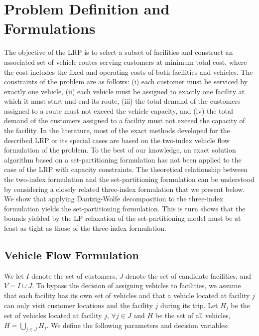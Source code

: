 \documentclass[graybox]{./styles/svmult}
\begin{document}
\section{Problem Definition and Formulations}
\label{sec:ProbDef}
The objective of the LRP is to select a subset of facilities and
construct an associated set of vehicle routes serving customers at
minimum total cost, where the cost includes the fixed and operating
costs of both facilities and vehicles. The constraints of the problem
are as follows: (i) each customer must be serviced by exactly one
vehicle, (ii) each vehicle must be assigned to exactly one facility at
which it must start and end its route, (iii) the total demand of the
customers assigned to a route must not exceed the vehicle capacity,
and (iv) the total demand of the customers assigned to a facility must
not exceed the capacity of the facility. In the literature, most of
the exact methods developed for the described LRP or its special cases
are based on the two-index vehicle flow formulation of the problem. To
the best of our knowledge, an exact solution algorithm based on a
set-partitioning formulation has not been applied to the case of the
LRP with capacity constraints. The theoretical relationship between
the two-index formulation and the set-partitioning formulation can be
understood by considering a closely related three-index formulation
that we present below. 
We show that applying Dantzig-Wolfe
decomposition to the three-index formulation yields the
set-partitioning formulation. This is turn shows that the bounds
yielded by the LP relaxation of the set-partitioning model must be at
least as tight as those of the three-index formulation.

\subsection{Vehicle Flow Formulation}

We let $I$ denote the set of customers, $J$ denote the set of
candidate facilities, and $V = I \cup J$. To bypass the decision 
of assigning vehicles to facilities, we assume that each facility
has its own set of vehicles and that a vehicle located at facility $j$ can
only visit customer locations and the facility $j$ during its trip.
Let $H_j$ be the set of
vehicles located at facility $j$, $\forall j \in J$ and $H$ be the set
of all vehicles, $H = \bigcup_{j \in J}H_j$. We define the following
parameters and decision variables:
\end{document}
